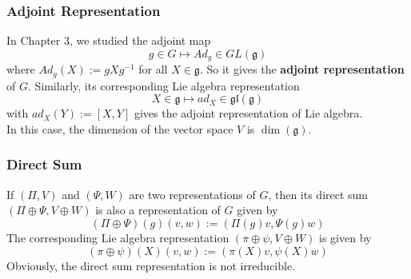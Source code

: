 \documentclass[11pt]{article}
\newcommand{\mf}[1]{\mathfrak{#1}}
\begin{document}
\subsubsection{Adjoint Representation}
In Chapter 3, we studied the adjoint map
$$g \in G \mapsto Ad_g \in GL(\mf{g})$$
where $Ad_g(X) := gXg^{-1}$ for all $X \in \mf{g}$. So it gives the \textbf{adjoint representation} of $G$. Similarly, its corresponding Lie algebra representation
$$X \in \mf{g} \mapsto ad_X \in \mf{gl}(\mf{g})$$
with $ad_X(Y) := [X,Y]$ gives the adjoint representation of Lie algebra.\\
In this case, the dimension of the vector space $V$ is $\dim(\mf{g})$.
\subsubsection{Direct Sum}
If $(\Pi,V)$ and $(\Psi,W)$ are two representations of $G$, then its direct sum $(\Pi \oplus \Psi, V \oplus W)$ is also a representation of $G$ given by
$$(\Pi \oplus \Psi)(g)(v,w) := (\Pi(g)v, \Psi(g)w)$$
The corresponding Lie algebra representation $(\pi \oplus \psi, V \oplus W)$ is given by
$$(\pi \oplus \psi)(X)(v,w) := (\pi(X)v, \psi(X)w)$$
Obviously, the direct sum representation is not irreducible.
\end{document}
